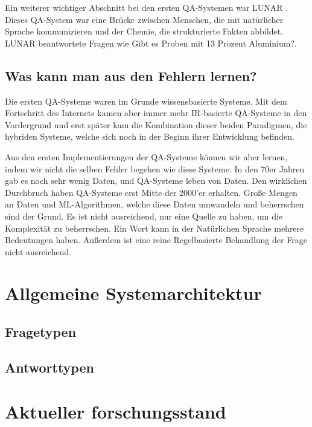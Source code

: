 \documentclass[
        ngerman,
        paper=a4,
        numbers=noendperiod,
]{scrreprt}
\begin{document}
Ein weiterer wichtiger Abschnitt bei den ersten QA-Systemen war \glqq LUNAR\grqq{} \citep{Woods1978SemanticsAnswering}. Dieses QA-System war eine Brücke zwischen Menschen, die mit natürlicher Sprache kommunizieren und der Chemie, die strukturierte Fakten abbildet. LUNAR beantwortete  Fragen wie \glqq Gibt es Proben mit 13 Prozent Aluminium?\grqq{}. 

\subsection{Was kann man aus den Fehlern lernen?}
Die ersten QA-Systeme waren im Grunde wissensbasierte Systeme. Mit dem Fortschritt des Internets kamen aber immer mehr IR-basierte QA-Systeme in den Vordergrund und erst später kam die Kombination dieser beiden Paradigmen, die hybriden Systeme, welche sich noch in der Beginn ihrer Entwicklung befinden. 

Aus den ersten Implementierungen der QA-Systeme können wir aber lernen, indem wir nicht die selben Fehler begehen wie diese Systeme. In den 70er Jahren gab es noch sehr wenig Daten, und QA-Systeme leben von Daten. Den wirklichen Durchbruch haben QA-Systeme erst Mitte der 2000'er erhalten. Große Mengen an Daten und ML-Algorithmen, welche diese Daten umwandeln und beherrschen sind der Grund. Es ist nicht ausreichend, nur eine Quelle zu haben, um die Komplexität zu beherrschen. Ein Wort kann in der Natürlichen Sprache mehrere Bedeutungen haben. Außerdem ist eine reine Regelbasierte Behandlung der Frage nicht ausreichend.

\section{Allgemeine Systemarchitektur} %
\subsection{Fragetypen}
\subsection{Antworttypen}
\section{Aktueller forschungsstand} %
\end{document}
